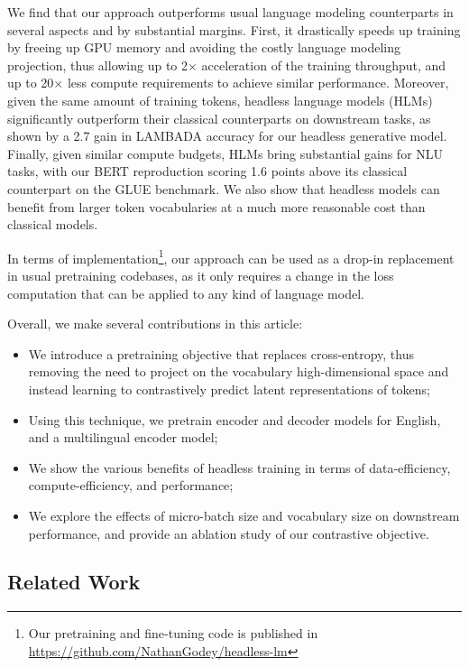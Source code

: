 We find that our approach outperforms usual language modeling counterparts in several aspects and by substantial margins. First, it drastically speeds up training by freeing up GPU memory and avoiding the costly language modeling projection, thus allowing up to 2$\times$ acceleration of the training throughput, and up to 20$\times$ less compute requirements to achieve similar performance. Moreover, given the same amount of training tokens, headless language models (HLMs) significantly outperform their classical counterparts on downstream tasks, as shown by a 2.7 gain in LAMBADA accuracy for our headless generative model. Finally, given similar compute budgets, HLMs bring substantial gains for NLU tasks, with our BERT reproduction scoring 1.6 points above its classical counterpart on the GLUE benchmark. We also show that headless models can benefit from larger token vocabularies at a much more reasonable cost than classical models.


In terms of implementation\footnote{Our pretraining and fine-tuning code is published in \url{https://github.com/NathanGodey/headless-lm}}, our approach can be used as a drop-in replacement in usual pretraining codebases, as it only requires a change in the loss computation that can be applied to any kind of language model.

Overall, we make several contributions in this article:
\begin{itemize}
    \item We introduce a pretraining objective that replaces cross-entropy, thus removing the need to project on the vocabulary high-dimensional space and instead learning to contrastively predict latent representations of tokens;
    \item Using this technique, we pretrain encoder and decoder models for English, and a multilingual encoder model;
    \item We show the various benefits of headless training in terms of data-efficiency, compute-efficiency, and performance;
    \item We explore the effects of micro-batch size and vocabulary size on downstream performance, and provide an ablation study of our contrastive objective. 
\end{itemize}



\subsection{Related Work}
